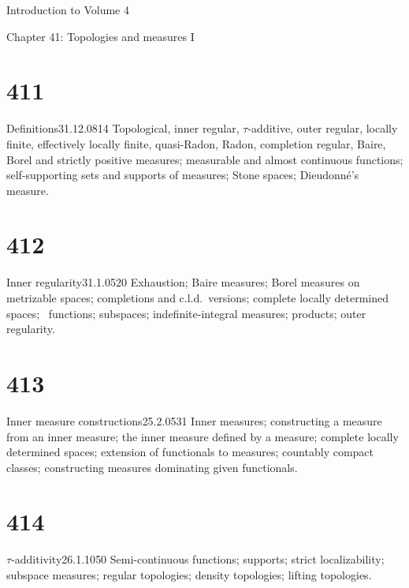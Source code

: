 
Introduction to Volume 4 


Chapter 41:  Topologies and measures I


\section{411}{Definitions}{31.12.08}{14}{}
{Topological, inner regular, $\tau$-additive, outer regular,
locally finite, effectively locally finite, quasi-Radon, Radon,
completion regular, Baire, Borel and strictly positive measures;
measurable and almost continuous functions;   self-supporting sets and
supports of measures;  Stone spaces;  Dieudonn\'e's measure.}

\section{412}{Inner regularity}{31.1.05}{20}{}
{Exhaustion;  Baire measures;  Borel measures on metrizable
spaces;  completions and c.l.d.\ versions;  complete locally determined
spaces;  \imp\ functions;  subspaces;  indefinite-integral measures;
products;  outer regularity.}

\section{413}{Inner measure constructions}{25.2.05}{31}{}
{Inner measures;  constructing a measure from an inner measure;
the inner measure defined by a measure;  complete locally determined
spaces;  extension of functionals to measures;  countably compact
classes;  constructing measures dominating given functionals.}

\section{414}{$\tau$-additivity}{26.1.10}{50}{}
{Semi-continuous functions;  supports;  strict
localizability;  subspace measures;  regular topologies;  density
topologies;  lifting topologies.}


